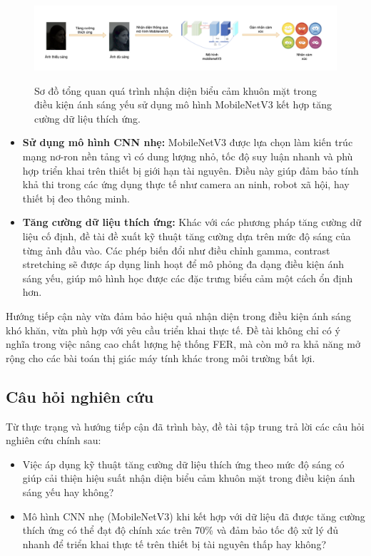 \begin{figure}[H]
    \centering
    \includegraphics[width=12cm]{./img/phuong_phap_tiep_can.png} \\[0.5cm]
    \caption{Sơ đồ tổng quan quá trình nhận diện biểu cảm khuôn mặt trong điều kiện ánh sáng yếu sử dụng mô hình MobileNetV3 kết hợp tăng cường dữ liệu thích ứng.}
    \label{fig:phuong_phap_tiep_can}
\end{figure}

\begin{itemize}
    \item \textbf{Sử dụng mô hình CNN nhẹ:} MobileNetV3 được lựa chọn làm kiến trúc mạng nơ-ron nền tảng vì có dung lượng nhỏ, tốc độ suy luận nhanh và phù hợp triển khai trên thiết bị giới hạn tài nguyên. Điều này giúp đảm bảo tính khả thi trong các ứng dụng thực tế như camera an ninh, robot xã hội, hay thiết bị đeo thông minh.
    
    \item \textbf{Tăng cường dữ liệu thích ứng:} Khác với các phương pháp tăng cường dữ liệu cố định, đề tài đề xuất kỹ thuật tăng cường dựa trên mức độ sáng của từng ảnh đầu vào. Các phép biến đổi như điều chỉnh gamma, contrast stretching sẽ được áp dụng linh hoạt để mô phỏng đa dạng điều kiện ánh sáng yếu, giúp mô hình học được các đặc trưng biểu cảm một cách ổn định hơn.
\end{itemize}

Hướng tiếp cận này vừa đảm bảo hiệu quả nhận diện trong điều kiện ánh sáng khó khăn, vừa phù hợp với yêu cầu triển khai thực tế. Đề tài không chỉ có ý nghĩa trong việc nâng cao chất lượng hệ thống FER, mà còn mở ra khả năng mở rộng cho các bài toán thị giác máy tính khác trong môi trường bất lợi.

\subsection*{Câu hỏi nghiên cứu} %

Từ thực trạng và hướng tiếp cận đã trình bày, đề tài tập trung trả lời các câu hỏi nghiên cứu chính sau:

\begin{itemize}
    \item Việc áp dụng kỹ thuật tăng cường dữ liệu thích ứng theo mức độ sáng có giúp cải thiện hiệu suất nhận diện biểu cảm khuôn mặt trong điều kiện ánh sáng yếu hay không?
    
    \item Mô hình CNN nhẹ (MobileNetV3) khi kết hợp với dữ liệu đã được tăng cường thích ứng có thể đạt độ chính xác trên 70\% và đảm bảo tốc độ xử lý đủ nhanh để triển khai thực tế trên thiết bị tài nguyên thấp hay không?
\end{itemize}